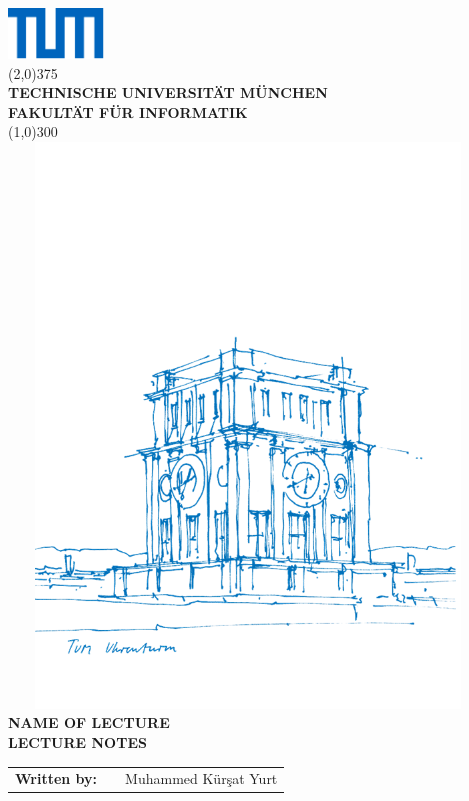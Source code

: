 \documentclass[11pt,a4paper,twoside,titlepage]{article}
\begin{document}
\begin{titlepage}
  \begin{center}
    \includegraphics[width=1in]{fig/Universitaet_Logo_RGB.pdf}\\
    \line(2,0){375}\\
    [3.5mm]
    \textbf{\Large{TECHNISCHE UNIVERSITÄT MÜNCHEN}} \\
    \large{\textbf{FAKULTÄT FÜR INFORMATIK}}\\
    \line(1,0){300}\\
    \includegraphics[width=5in,height=15cm,keepaspectratio]{fig/TUM_Uhrenturm.png}\\[1cm]
    \Large{\textbf {NAME OF LECTURE}} \\[0.5cm]
    \Large{\textbf {LECTURE NOTES}}
  \end{center}
  \begin{flushleft}
    \vspace{2cm}
    \begin{tabular}{ l l l }
      \textbf {Written by:} &  & Muhammed Kürşat Yurt \\
    \end{tabular}
  \end{flushleft}
\end{titlepage}
\pagestyle{fancy}
\fancyhf{}
\renewcommand{\headrulewidth}{1.75pt}
\renewcommand{\footrulewidth}{1.5pt}
\fancyfoot[C]{\thepage}
\renewcommand{\sectionmark}[1]{\markright{#1}}
\fancyhead[C]{\textbf{\MakeUppercase{\rightmark}}}
\newpage
\tableofcontents
\newpage
{}
\setcounter{page}{1}
\end{document}
